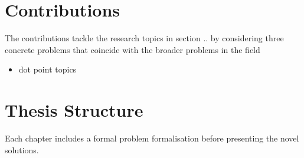 \section{Contributions}\label{sec:intro:contributions}

The contributions tackle the research topics in section .. by considering three concrete problems that coincide with the broader problems in the field

\begin{itemize}
    \item dot point topics
\end{itemize}



% 
%                                                                    
%                                                                    
%                                                                    
% 

\section{Thesis Structure}\label{sec:intro:structure}

Each chapter includes a formal problem formalisation before presenting the novel solutions.